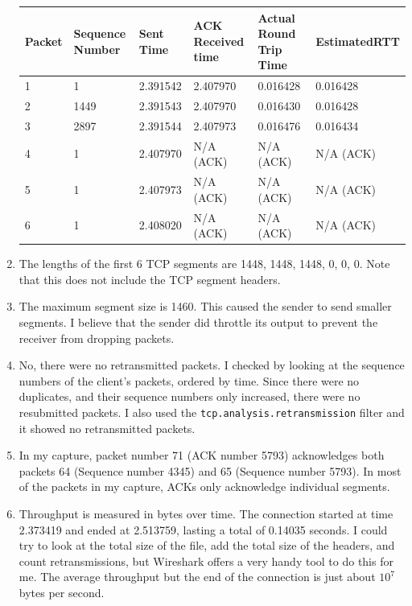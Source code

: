 \documentclass[12pt]{article}
\begin{document}
\begin{enumerate}
        \begin{table}[h]
            \centering
            \begin{tabular}{ p{1cm} | p{1.5cm} | p{1.5cm} | p{2.5cm} | p{2.5cm} | p{1.5cm}}
            Packet & Sequence Number & Sent Time & ACK Received time & Actual Round Trip Time & EstimatedRTT \\
            \hline
            1      & 1               & 2.391542    & 2.407970        & 0.016428               & 0.016428 \\
            2      & 1449            & 2.391543    & 2.407970        & 0.016430               & 0.016428 \\
            3      & 2897            & 2.391544    & 2.407973        & 0.016476               & 0.016434 \\
                4      & 1               & 2.407970    & N/A (ACK)       & N/A (ACK)                 & N/A (ACK) \\
                5      & 1               & 2.407973    & N/A (ACK)       & N/A (ACK)                 & N/A (ACK) \\
                6      & 1               & 2.408020    & N/A (ACK)       & N/A (ACK)                 & N/A (ACK) \\
        \end{tabular}
    \end{table}
    \item The lengths of the first 6 TCP segments are 1448, 1448, 1448, 0, 0, 0. Note that this does not include the TCP segment headers.
    \item The maximum segment size is 1460. This caused the sender to send smaller segments. I believe that the sender did throttle its output to prevent the receiver from dropping packets.
    \item No, there were no retransmitted packets. I checked by looking at the sequence numbers of the client's packets, ordered by time. Since there were no duplicates, and their sequence numbers only increased, there were no resubmitted packets. I also used the \texttt{tcp.analysis.retransmission} filter and it showed no retransmitted packets.
    \item In my capture, packet number 71 (ACK number 5793) acknowledges both packets 64 (Sequence number 4345) and 65 (Sequence number 5793). In most of the packets in my capture, ACKs only acknowledge individual segments.
    \item Throughput is measured in bytes over time. The connection started at time 2.373419 and ended at 2.513759, lasting a total of 0.14035 seconds. I could try to look at the total size of the file, add the total size of the headers, and count retransmissions, but Wireshark offers a very handy tool to do this for me. The average throughput but the end of the connection is just about $10^7$ bytes per second.

\end{enumerate}
\end{document}

